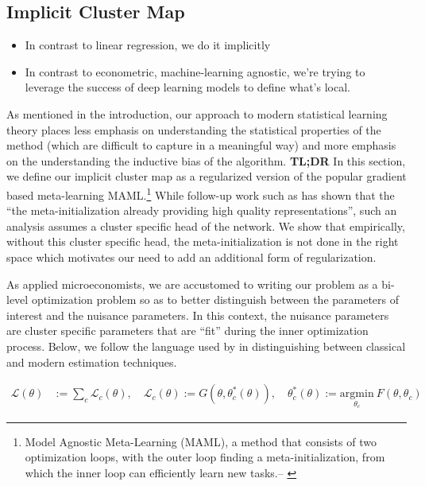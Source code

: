 \documentclass[a4paper,12pt]{article}
\begin{document}
\subsection{Implicit Cluster Map}
\begin{itemize}
    \item In contrast to linear regression, we do it implicitly 
    \item In contrast to econometric, machine-learning agnostic, we're trying to leverage the success of deep learning models to define what's local. 
\end{itemize}
As mentioned in the introduction, our approach to modern statistical learning theory places less emphasis on understanding the statistical properties of the method (which are difficult to capture in a meaningful way) and more emphasis on the understanding the inductive bias of the algorithm. 
\textbf{TL;DR} In this section, we define our implicit cluster map as a regularized version of the popular gradient based meta-learning MAML.\footnote{Model Agnostic Meta-Learning (MAML), a method that consists of two optimization loops, with the outer loop finding a meta-initialization,
from which the inner loop can efficiently learn new tasks.-- \cite{raghu2019rapid}} While follow-up work such as \cite{raghu2019rapid} has shown that the ``the meta-initialization already providing high quality
representations'', such an analysis assumes a cluster specific head of the network. We show that empirically, without this cluster specific head, the meta-initialization is not done in the right space which motivates our need to add an additional form of regularization.

As applied microeconomists, we are accustomed to writing our problem as a bi-level optimization problem so as to better distinguish between the parameters of interest and the nuisance parameters. In this context, the nuisance parameters are cluster specific parameters that are ``fit'' during the inner optimization process. Below, we follow the language used by \cite{belkin2021fit} in distinguishing between classical and modern estimation techniques.
 
\begin{align*}
    \mathcal{L}(\theta) &:= \sum _c \mathcal{L}_c(\theta), \quad \mathcal{L}_c(\theta) := G(\theta, \theta^*_c(\theta)), \quad  \theta_c^*(\theta) := \underset{\theta_c}{\textrm{argmin}} \ F(\theta, \theta_c) 
\end{align*}
\end{document}
